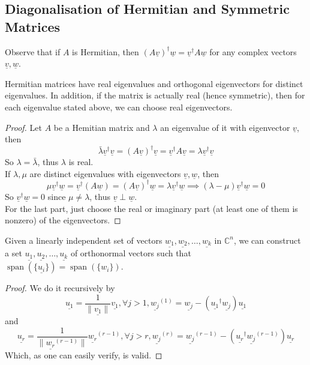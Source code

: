 \subsection{Diagonalisation of Hermitian and Symmetric Matrices}
Observe that if $A$ is Hermitian, then $(A\underline{v})^\dagger\underline{w}=\underline{v}^\dagger A\underline{w}$ for any complex vectors $\underline{v},\underline{w}$.
\begin{proposition}
    Hermitian matrices have real eigenvalues and orthogonal eigenvectors for distinct eigenvalues.
    In addition, if the matrix is actually real (hence symmetric), then for each eigenvalue stated above, we can choose real eigenvectors.
\end{proposition}
\begin{proof}
    Let $A$ be a Hemitian matrix and $\lambda$ an eigenvalue of it with eigenvector $\underline{v}$, then
    $$\bar{\lambda}\underline{v}^\dagger\underline{v}=(A\underline{v})^\dagger\underline{v}=\underline{v}^\dagger A\underline{v}=\lambda\underline{v}^\dagger\underline{v}$$
    So $\lambda=\bar\lambda$, thus $\lambda$ is real.\\
    If $\lambda,\mu$ are distinct eigenvalues with eigenvectors $\underline{v},\underline{w}$, then
    $$\mu\underline{v}^\dagger\underline{w}=\underline{v}^\dagger(A\underline{w})=(A\underline{v})^\dagger\underline{w}=\lambda\underline{v}^\dagger\underline{w}\implies (\lambda-\mu)\underline{v}^\dagger\underline{w}=0$$
    So $\underline{v}^\dagger\underline{w}=0$ since $\mu\neq\lambda$, thus $\underline{v}\perp\underline{w}$.\\
    For the last part, just choose the real or imaginary part (at least one of them is nonzero) of the eigenvectors.
\end{proof}
\begin{proposition}
    Given a linearly independent set of vectors $\underline{w_1},\underline{w_2},\ldots,\underline{w_k}$ in $\mathbb C^n$, we can construct a set $\underline{u_1},\underline{u_2},\ldots,\underline{u_k}$ of orthonormal vectors such that $\operatorname{span}(\{\underline{u_i}\})=\operatorname{span}(\{w_i\})$.
\end{proposition}
\begin{proof}
    We do it recursively by
    $$\underline{u_1}=\frac{1}{\|\underline{v_1}\|}\underline{v_1},\forall j>1,\underline{w_j}^{(1)}=\underline{w_j}-(\underline{u_1}^\dagger \underline{w_j})\underline{u_1}$$
    and
    $$\underline{u_r}=\frac{1}{\|\underline{w_r}^{(r-1)}\|}\underline{w_r}^{(r-1)},\forall j>r,\underline{w_j}^{(r)}=\underline{w_j}^{(r-1)}-(\underline{u_r}^\dagger \underline{w_j}^{(r-1)})\underline{u_r}$$
    Which, as one can easily verify, is valid.
\end{proof}
